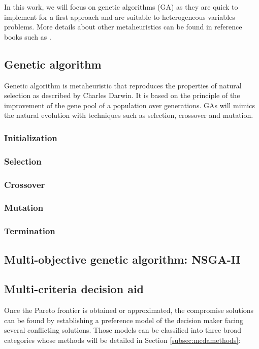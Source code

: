 In this work, we will focus on genetic algorithms (GA) as they are quick to implement for a first approach and are suitable to heterogeneous variables problems. More details about other metaheuristics can be found in reference books such as \cite{talbi09,dreo06metaheuristics,8125462}.

\subsection{Genetic algorithm}
Genetic algorithm is metaheuristic that reproduces the properties of natural selection as described by Charles Darwin. It is based on the principle of the improvement of the gene pool of a population over generations. GAs will mimics the natural evolution with techniques such as selection, crossover and mutation.

\subsubsection{Initialization}

\subsubsection{Selection}

\subsubsection{Crossover}

\subsubsection{Mutation}

\subsubsection{Termination}

\subsection{Multi-objective genetic algorithm: NSGA-II}
\cite{Srinivas94multiobjectiveoptimization, Deb00afast}

\subsection{Multi-criteria decision aid}
\label{subsec:mcda}
Once the Pareto frontier is obtained or approximated, the compromise solutions can be found by establishing a preference model of the decision maker facing several conflicting solutions. Those models can be classified into three broad categories \cite{Vin92, beltstew} whose methods will be detailed in Section \ref{subsec:mcdamethods}:

